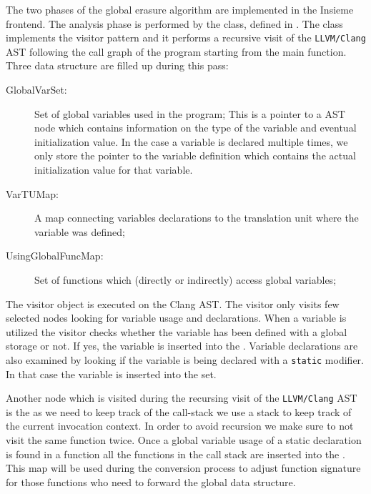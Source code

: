 The two phases of the global erasure algorithm are implemented in the Insieme
frontend. The analysis phase is performed by the
 class, defined in
. The class implements the visitor
pattern and it performs a recursive visit of the {\tt LLVM/Clang} AST following
the call graph of the program starting from the main function. Three data
structure are filled up during this pass: \begin{description}

\item [GlobalVarSet:] Set of global variables used in the program; This is a
pointer to a  AST node which contains information on the
type of the variable and eventual initialization value. In the case a variable
is declared multiple times, we only store the pointer to the variable definition
which contains the actual initialization value for that variable. 
\item [VarTUMap:] A map connecting variables declarations to the translation unit
where the variable was defined;
\item [UsingGlobalFuncMap:] Set of functions which (directly or indirectly)
access global variables;
\end{description}

The visitor object is executed on the Clang AST. The visitor only visits few
selected nodes looking for variable usage and declarations. When a variable is
utilized the visitor checks whether the variable has been defined with a global
storage or not. If yes, the variable is inserted into the .
Variable declarations are also examined by looking if the variable is being
declared with a {\tt static} modifier. In that case the variable is inserted
into the set. 

Another node which is visited during the recursing visit of the {\tt LLVM/Clang}
AST is the  as we need to keep track of the call-stack we
use a stack to keep track of the current invocation context. In order to avoid
recursion we make sure to not visit the same function twice. Once a global
variable usage of a static declaration is found in a function all the functions
in the call stack are inserted into the . This map will
be used during the conversion process to adjust function signature for those
functions who need to forward the global data structure. 

